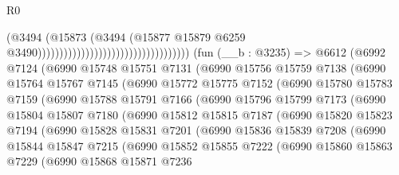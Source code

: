 \begin{lexlean}{R0}
\begin{coremodule}
                                                                  (@3494
                                                                    (@15873
                                                                      (@3494
                                                                        (@15877
                                                                          @15879
                                                                          @6259
                                                                          @3490)))))))))))))))))))))))))))))))))))
    (fun (__b : @3235) =>
    @6612
      (@6992
        @7124
        (@6990
          @15748
          @15751
          @7131
          (@6990
            @15756
            @15759
            @7138
            (@6990
              @15764
              @15767
              @7145
              (@6990
                @15772
                @15775
                @7152
                (@6990
                  @15780
                  @15783
                  @7159
                  (@6990
                    @15788
                    @15791
                    @7166
                    (@6990
                      @15796
                      @15799
                      @7173
                      (@6990
                        @15804
                        @15807
                        @7180
                        (@6990
                          @15812
                          @15815
                          @7187
                          (@6990
                            @15820
                            @15823
                            @7194
                            (@6990
                              @15828
                              @15831
                              @7201
                              (@6990
                                @15836
                                @15839
                                @7208
                                (@6990
                                  @15844
                                  @15847
                                  @7215
                                  (@6990
                                    @15852
                                    @15855
                                    @7222
                                    (@6990
                                      @15860
                                      @15863
                                      @7229
                                      (@6990
                                        @15868
                                        @15871
                                        @7236

\end{coremodule}
\end{lexlean}
